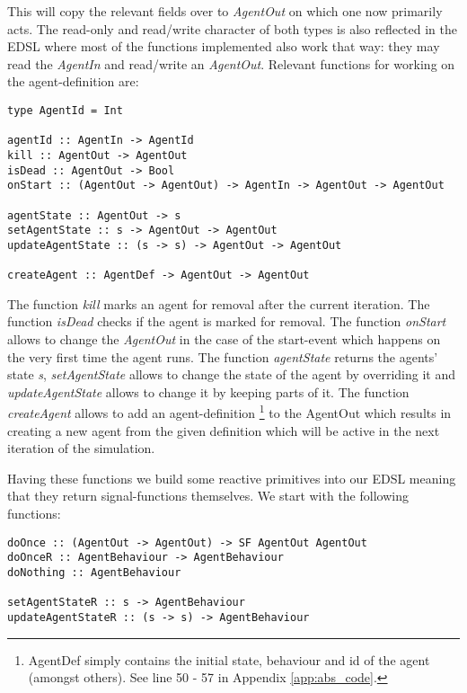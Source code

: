 This will copy the relevant fields over to \textit{AgentOut} on which one now primarily acts. The read-only and read/write character of both types is also reflected in the EDSL where most of the functions implemented also work that way: they may read the \textit{AgentIn} and read/write an \textit{AgentOut}. Relevant functions for working on the agent-definition are:

\begin{verbatim}
type AgentId = Int

agentId :: AgentIn -> AgentId
kill :: AgentOut -> AgentOut
isDead :: AgentOut -> Bool
onStart :: (AgentOut -> AgentOut) -> AgentIn -> AgentOut -> AgentOut

agentState :: AgentOut -> s
setAgentState :: s -> AgentOut -> AgentOut
updateAgentState :: (s -> s) -> AgentOut -> AgentOut

createAgent :: AgentDef -> AgentOut -> AgentOut
\end{verbatim}

The function \textit{kill} marks an agent for removal after the current iteration. The function \textit{isDead} checks if the agent is marked for removal. The function \textit{onStart} allows to change the \textit{AgentOut} in the case of the start-event which happens on the very first time the agent runs. The function \textit{agentState} returns the agents' state \textit{s}, \textit{setAgentState} allows to change the state of the agent by overriding it and \textit{updateAgentState} allows to change it by keeping parts of it. The function \textit{createAgent} allows to add an agent-definition \footnote{AgentDef simply contains the initial state, behaviour and id of the agent (amongst others). See line 50 - 57 in Appendix \ref{app:abs_code}.} to the AgentOut which results in creating a new agent from the given definition which will be active in the next iteration of the simulation. 

Having these functions we build some reactive primitives into our EDSL meaning that they return signal-functions themselves. We start with the following functions:

\begin{verbatim}
doOnce :: (AgentOut -> AgentOut) -> SF AgentOut AgentOut
doOnceR :: AgentBehaviour -> AgentBehaviour
doNothing :: AgentBehaviour

setAgentStateR :: s -> AgentBehaviour
updateAgentStateR :: (s -> s) -> AgentBehaviour
\end{verbatim}

